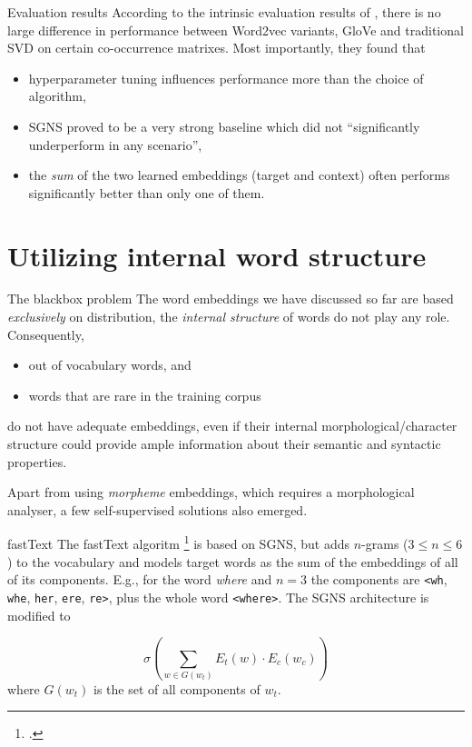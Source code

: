 \documentclass[style=upen, size=14pt]{powerdot}
\theoremstyle{definition}
\begin{document}
\begin{slide}[toc=Results]{Evaluation results}
  According to the intrinsic evaluation results of \cite{levy2015improving},
  there is no large difference in performance between Word2vec variants, GloVe
  and traditional SVD on certain co-occurrence matrixes. Most importantly, they
  found that
  \begin{itemize}
  \item hyperparameter tuning influences performance more than the choice of algorithm,
  \item SGNS proved to be a very strong baseline which did not ``significantly
    underperform in any scenario'',
  \item the \emph{sum} of the two learned embeddings (target and context) often
    performs significantly better than only one of them.
  \end{itemize}
\end{slide}

\section[toc=Internal word structure]{Utilizing internal word structure}

\begin{slide}[toc=Blackbox problem]{The blackbox problem}
  The word embeddings we have discussed so far are based \emph{exclusively} on
  distribution, the \emph{internal structure} of words do not play any role.
  Consequently,
  \begin{itemize}
  \item out of vocabulary words, and
  \item words that are rare in the training corpus
  \end{itemize}
  do not have adequate embeddings, even if their internal
  morphological/character structure could provide ample information about their
  semantic and syntactic properties.\bigskip

  Apart from using \emph{morpheme} embeddings, which requires a morphological
  analyser, a few self-supervised solutions also emerged.
\end{slide}

\begin{slide}[toc=fastText]{fastText}
  The fastText algoritm \footnote{\cite{bojanowski2017enriching}.} is based on
  SGNS, but adds $n$-grams ($3\leq n \leq 6$) to the vocabulary and models
  target words as the sum of the embeddings of all of its components. E.g., for
  the word \emph{where} and $n=3$ the components are \texttt{<wh}, \texttt{whe},
  \texttt{her}, \texttt{ere}, \texttt{re>}, plus the whole word
  \texttt{<where>}. The SGNS architecture is modified to 

  $$
  \sigma(\sum_{w\in G(w_t)}E_t(w)\cdot E_c(w_c)) 
  $$
  where $G(w_t)$ is the set of all components of $w_t$.
\end{slide}
\end{document}
